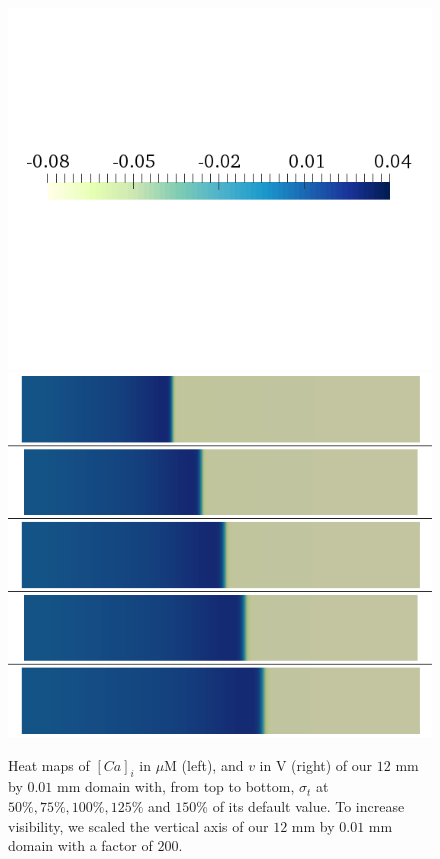 \documentclass{article}
\begin{document}
\begin{figure}
\begin{minipage}{0.5\textwidth}
\includegraphics[trim=0cm 7cm 0cm 6cm, clip=true, width=1\linewidth]{legend_v2}
\includegraphics[trim=0cm 0cm 0cm 0cm, clip=true, width=1\linewidth]{v_sigma}
    \end{minipage}
    \caption{Heat maps of $[Ca]_i$ in $\mu$M (left), and $v$ in V (right) of our $12$ mm by $0.01$ mm domain with, from top to bottom, $\sigma_{t}$ at $50\%, 75\%, 100\%, 125\%$ and $150\%$ of its default value. To increase visibility, we scaled the vertical axis of our $12$ mm by $0.01$ mm domain with a factor of $200$.}
    \label{fig:1e}
\end{figure}
%
%
\end{document}

